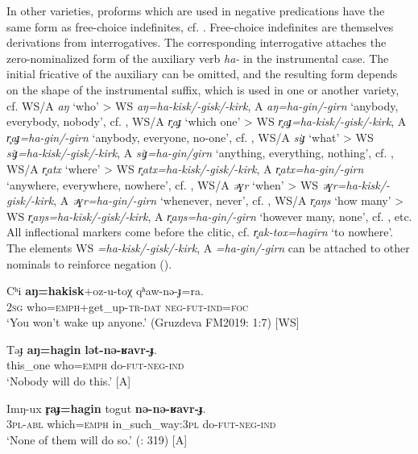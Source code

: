 \documentclass[output=paper,colorlinks,citecolor=brown]{langscibook}
\begin{document}
In other varieties, proforms which are used in negative predications have the same form as free-choice indefinites, cf. . Free-choice indefinites are themselves derivations from interrogatives. The corresponding interrogative attaches the zero-nominalized form of the auxiliary verb \textit{ha-} in the instrumental case. The initial fricative of the auxiliary can be omitted, and the resulting form depends on the shape of the instrumental suffix, which is used in one or another variety, cf. WS/A \textit{aŋ} ‘who’ > WS \textit{aŋ=ha-kisk/-gisk/-kirk}, A \textit{aŋ=ha-gin/-girn} ‘anybody, everybody, nobody’, cf. , WS/A \textit{r̥aɟ} ‘which one’ > WS \textit{r̥aɟ=ha-kisk/-gisk/-kirk}, A \textit{r̥aɟ=ha-gin/-girn} ‘anybody, everyone, no-one’, cf. , WS/A \textit{siɟ} ‘what’ > WS \textit{siɟ=ha-kisk/-gisk/-kirk}, A \textit{siɟ=ha-gin/girn} ‘anything, everything, nothing’, cf. , WS/A \textit{r̥atx} ‘where’ > WS \textit{r̥atx=ha-kisk/-gisk/-kirk}, A \textit{r̥atx=ha-gin/-girn} ‘anywhere, everywhere, nowhere’, cf. , WS/A \textit{əɣr} ‘when’ > WS \textit{əɣr=ha-kisk/-gisk/-kirk}, A \textit{əɣr=ha-gin/-girn} ‘whenever, never’, cf. , WS/A \textit{r̥aŋs} ‘how many’ > WS \textit{r̥aŋs=ha-kisk/-gisk/-kirk}, A \textit{r̥aŋs=ha-gin/-girn} ‘however many, none’, cf. , etc. All inflectional markers come before the clitic, cf. \textit{r̥ak-tox=hagirn} ‘to nowhere’. The elements WS \textit{=ha-kisk/-gisk/-kirk}, A \textit{=ha-gin/-girn} can be attached to other nominals to reinforce negation ().

\ea\label{ex:niv:123}
    \gll Cʰi \textbf{aŋ=hakisk}+oz-u-toχ qʰaw-nə-ɟ=ra. \\ 
         2\textsc{sg} who=\textsc{emph}+get\_up-\textsc{tr-dat} \textsc{neg-fut-ind=foc} \\
    \glt ‘You won’t wake up anyone.’ (Gruzdeva FM2019: 1:7) [WS]
\z 

\ea\label{ex:niv:124}
    \gll  Təɟ \textbf{aŋ=hagin} \textbf{lət-nə-ʁavr-ɟ}. \\ 
         this\_one who=\textsc{emph} do-\textsc{fut-neg-ind} \\
    \glt ‘Nobody will do this.’ \citep[165]{Panfilov1965} [A]
\z 

\ea\label{ex:niv:125}
    \gll Imŋ-ux \textbf{r̥aɟ=hagin} togut \textbf{nə{}-nə{}-ʁavr-ɟ}. \\ 
         3\textsc{pl}{}-\textsc{abl} which=\textsc{emph} in\_such\_way:\textsc{3pl} do{}-\textsc{fut-neg}{}-\textsc{ind} \\
    \glt ‘None of them will do so.’ (\citealt{SaveljevaTaksami1970}: 319) [A]
\z 
\end{document}
